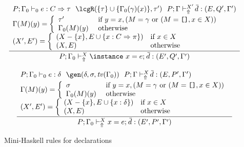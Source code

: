 \begin{figure}
\[\begin{array}{cc}
	\displaystyle\frac
	 {\begin{array}{l}
            P; \Gamma_0 \vdash_0 e : C \Rightarrow \tau \:\:\:
            \lcgR(\{ \tau\} \cup \{ \Gamma_0(\gamma)(x)\}, \tau') \:\:\:
           P;\Gamma \vdash_{\Uparrow}^{X'} \overline{\!d} : (E,Q',\Gamma') \\[.1cm]
           \Gamma(M)(y) = \left\{ \begin{array}{ll}
                                      \tau' & \text{ if } y = x, (M = \gamma \text{ or }
                                                                 (M = \texttt{[]}, x \in X)) \\
                                      \Gamma_0(M)(y) & \text{ otherwise } 
                                   \end{array}\right. \\[.2cm] 
           (X',E') = \left\{ \begin{array}{ll}
                               (X - \{ x \}, E \cup \{ x : C\Rightarrow \pi \}) 
                                   & \text{if } x \in X\\
                               (X, E) & \text{otherwise} 
                             \end{array}\right. 
          \end{array}}
	 {P;\Gamma_0 \vdash_{\Uparrow}^X \instance\ x = e;\: \overline{\!d} : (E',Q',\Gamma')} \\ \\

	\displaystyle\frac
	 {\begin{array}{l}
           P;\Gamma_0 \vdash_0 e : \delta \:\:\: \gen(\delta,\sigma,\tv(\Gamma_0)) \:\:\:
           P;\Gamma \vdash_{\Uparrow}^X \overline{\!d} : (E,P',\Gamma')\\[.1cm]

           \Gamma(M)(y) = \left\{ \begin{array}{ll}
                                    \sigma & \text{ if } y = x, (M = \gamma \text{ or }
                                                                 (M = \texttt{[]}, x \in X)) \\
                                      \Gamma_0(M)(y) & \text{ otherwise } 
                                   \end{array}\right.\\[.2cm]                   
           (X',E') = \left\{ \begin{array}{ll}
                               (X - \{ x \}, E \cup \{x : \delta\}) 
                                   & \text{if } x \in X\\
                               (X, E) & \text{otherwise} 
                             \end{array}\right. 
          \end{array}}
	 {P;\Gamma_0 \vdash_{\Uparrow}^X x = e;\: \overline{\!d} : (E',P',\Gamma')} 
\end{array} \]
\caption{Mini-Haskell rules for declarations}
\label{fig:mini-haskell-rules-for-declarations}
\end{figure}

